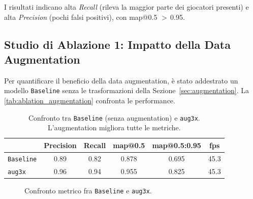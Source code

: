 \documentclass[12pt,a4paper,openright,twoside]{book}
\begin{document}
I risultati indicano alta \emph{Recall} (rileva la maggior parte dei giocatori presenti) e alta \emph{Precision} 
(pochi falsi positivi), con \ac{map}@0.5 $>\,$0.95.

\subsection{Studio di Ablazione 1: Impatto della Data Augmentation}
Per quantificare il beneficio della data augmentation, è stato addestrato un modello \texttt{Baseline} senza 
le trasformazioni della Sezione~\autoref{sec:augmentation}.
La \autoref{tab:ablation_augmentation} confronta le performance.

\begin{table}[t]
  \centering
  \caption{Confronto tra \texttt{Baseline} (senza augmentation) e \texttt{aug3x}. 
  L'augmentation migliora tutte le metriche.}
  \label{tab:ablation_augmentation}
  \begin{tabular}{l S[table-format=1.3] S[table-format=1.3] S[table-format=1.3] 
    S[table-format=1.3] S[table-format=2.1]}
    \toprule
    & {\textbf{Precision}} & {\textbf{Recall}} & {\textbf{\ac{map}@0.5}} & 
    {\textbf{\ac{map}@0.5:0.95}} & {\textbf{\ac{fps}}} \\
    \midrule
    \texttt{Baseline} & 0.89 & 0.82 & 0.878 & 0.695 & 45.3 \\
    \texttt{aug3x}    & 0.96 & 0.94 & 0.955 & 0.825 & 45.3 \\
    \bottomrule
  \end{tabular}
\end{table}

\begin{figure}[t]
  \centering
  \caption{Confronto metrico fra \texttt{Baseline} e \texttt{aug3x}.}
  \label{fig:bar_ablation}
\end{figure}
\end{document}
